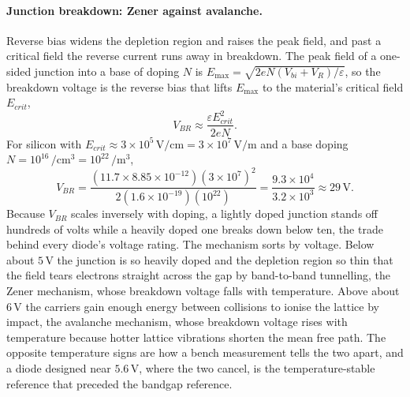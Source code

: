 

\paragraph{Junction breakdown: Zener against avalanche.}
Reverse bias widens the depletion region and raises the peak field, and past
a critical field the reverse current runs away in breakdown. The peak field
of a one-sided junction into a base of doping $N$ is $E_{\max} =
\sqrt{2eN(V_{bi}+V_R)/\varepsilon}$, so the breakdown voltage is the reverse
bias that lifts $E_{\max}$ to the material's critical field $E_{crit}$,
\[
V_{BR} \approx \frac{\varepsilon E_{crit}^{2}}{2eN}.
\]
For silicon with $E_{crit} \approx 3\times 10^{5}\,\si{\volt\per\centi
\meter} = 3\times 10^{7}\,\si{\volt\per\meter}$ and a base doping $N =
10^{16}\,\si{\per\centi\meter\cubed} = 10^{22}\,\si{\per\meter\cubed}$,
\[
V_{BR} = \frac{(11.7\times 8.85\times 10^{-12})(3\times 10^{7})^{2}}
              {2(1.6\times 10^{-19})(10^{22})}
       = \frac{9.3\times 10^{4}}{3.2\times 10^{3}}
       \approx 29\,\si{\volt}.
\]
Because $V_{BR}$ scales inversely with doping, a lightly doped junction
stands off hundreds of volts while a heavily doped one breaks down below ten,
the trade behind every diode's voltage rating. The mechanism sorts by
voltage. Below about $5\,\si{\volt}$ the junction is so heavily doped and the
depletion region so thin that the field tears electrons straight across the
gap by band-to-band tunnelling, the Zener mechanism, whose breakdown voltage
falls with temperature. Above about $6\,\si{\volt}$ the carriers gain enough
energy between collisions to ionise the lattice by impact, the avalanche
mechanism, whose breakdown voltage rises with temperature because hotter
lattice vibrations shorten the mean free path. The opposite temperature signs
are how a bench measurement tells the two apart, and a diode designed near
$5.6\,\si{\volt}$, where the two cancel, is the temperature-stable reference
that preceded the bandgap reference.

